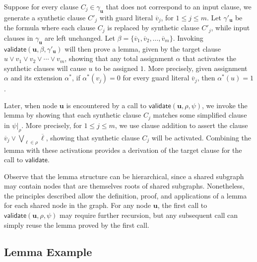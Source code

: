 \documentclass[twoside,11pt]{article}
\newcommand{\obar}[1]{\overline{#1}}
\newcommand{\lit}{\ell}
\newcommand{\extend}[1]{#1^{*}}
\newcommand{\assign}{\alpha}
\newcommand{\eassign}{\extend{\alpha}}
\newcommand{\passign}{\rho}
\newcommand{\lassign}{\beta}
\newcommand{\validate}{\textsf{validate}}
\newcommand{\makenode}[1]{\mathbf{#1}}
\newcommand{\nodeu}{\makenode{u}}
\newcommand{\simplify}[2]{#1|_{#2}}
\begin{document}
Suppose for every clause $C_j \in \gamma_{\nodeu}$ that does not correspond to
an input clause, we generate a synthetic clause $C'_j$ with guard literal
$\obar{v}_j$, for $1 \leq j \leq m$.  Let $\gamma'_{\nodeu}$ be the formula where each clause $C_j$ is replaced by synthetic clause $C'_j$,
while input clauses in $\gamma_{\nodeu}$ are left unchanged.
Let $\lassign = \{ \obar{v}_1, \obar{v}_2, \ldots, \obar{v}_m \}$.
Invoking $\validate(\nodeu, \lassign, \gamma'_{\nodeu})$
 will then prove a lemma, given by the target clause
 $u \lor v_1 \lor v_2 \lor \cdots \lor v_m$,
 showing that any total assignment $\assign$ that activates the synthetic clauses will cause $u$ to be assigned $1$.
 More precisely, given assignment $\assign$ and its extension $\eassign$, if $\eassign(v_j) = 0$ for every guard literal $\obar{v}_j$, then $\eassign(u) = 1$.

Later, when node $\nodeu$ is encountered by a call to $\validate(\nodeu, \passign, \psi)$, we invoke the lemma
by showing that each synthetic clause
$C_j$ matches some simplified clause in $\simplify{\psi}{\passign}$.  More precisely,
for $1 \leq j \leq m$,
we use clause addition to assert the clause
$\obar{v}_j \lor \bigvee_{\lit \in \passign} \obar{\lit}$,
showing that synthetic clause $C_j$ will be activated.
Combining the lemma with these activations provides a derivation of the target clause for the call to $\validate$.

Observe that the lemma structure can be hierarchical, since a shared
subgraph may contain nodes that are themselves roots of shared
subgraphs.  Nonetheless, the principles described allow the
definition, proof, and applications of a lemma for each shared node in
the graph.  For any node $\nodeu$, the first call to
$\validate(\nodeu, \passign, \psi)$ may require further recursion,
but any subsequent call can simply reuse the lemma proved by the first call.

\subsection{Lemma Example}
\label{app:lemma:eg}
\end{document}
